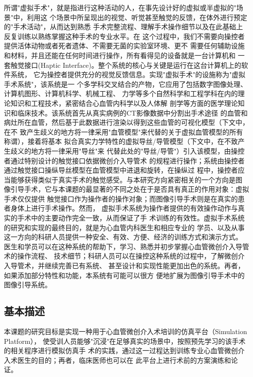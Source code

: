 所谓"虚拟手术"，就是指进行这种活动的人，在事先设计好的虚拟或半虚拟的"场景"中，利用这
个场景中所呈现出的视觉、听觉甚至触觉的反馈，在体外进行预定的"手术活动"，从而达到熟悉
手术完整流程、理解手术操作细节以及在此基础上反复训练以熟练掌握这种手术的专业水平。在
这个过程中，我们不需要向操控者提供活体动物或者死者遗体、不需要无菌的实验室环境、更不
需要任何辅助设施和材料，并且还能在任何时间进行操作，所有看得见的设备就是一台计算机和
一套触觉接口(Haptic Interface)。整个系统的核心与关键是运行在这台计算机上的软件系统，
它为操控者提供充分的视觉反馈信息。实现"虚拟手术"的设施称为"虚拟手术系统"，该系统是一
个多学科交叉结合的产物，它应用了包括数字图像处理、计算机图形、计算机科学、机械工程、
力学等多个自然科学和工程学科在内的理论知识和工程技术，紧密结合心血管内科学以及人体解
剖学等方面的医学理论知识和临床技术。该系统首先从真实病例的CT影像数据中分割出手术途径
的血管和病灶所在血管，然后基于此数据进行渲染以得到这些血管的可视化模型（下文中，在不
致产生歧义的地方将一律采用"血管模型"来代替的关于虚拟血管模型的所有称谓），接着将基本
拟合真实力学特性的虚拟导丝/导管模型（下文中，在不致产生歧义的地方将一律采用"导丝"来
代替此处的"导丝/导管"）引入该模型，由操控者通过特别设计的触觉接口依据微创介入导管术
的规程进行操作；系统由操控者通过触觉接口操纵导丝模型在血管模型中进退和旋转，在操纵过
程中，操控者应当能够获得类似于真实手术的触觉感受。与本研究方向紧密相关的一个方向是图
像引导手术，它与本课题的最显著的不同之处在于是否具有真正的作用对象：虚拟手术仅仅提供
触觉接口作为操作者的操作对象；而图像引导手术则是在真实的患者身体上进行手术操作。然而，
虚拟手术系统为操作者提供的有效操作动作与真实的手术中的主要动作完全一致，从而保证了手
术训练的有效性。虚拟手术系统的研究和实现的最终目的，就是为心血管内科医生和相应专业的
学员、以及从事这一方向的科研人员提供一种安全、有效、方便、经济的训练方式和演示方式。
医生和学员可以在这种系统的帮助下，学习、熟悉并初步掌握心血管微创介入导管术的操作流程、
技术细节；科研人员可以在操控这种系统的过程中，了解微创介入导管术，并继续完善已有系统、
甚至设计和实现性能更加出色的系统。再者，如果添加部分特性和功能，本系统有可能可以很方
便地扩展为图像引导手术中的图像引导系统。


\subsection{基本描述}
\label{subsec1-1-2}

本课题的研究目标是实现一种用于心血管微创介入术培训的仿真平台（Simulation Platform），
使受训人员能够"沉浸"在足够真实的场景中，按照预先学习的该手术的相关程序进行模拟仿真手
术的实践，通过这一过程达到训练专业心血管微创介入术医生的目的；再者，临床医师也可以在
此平台上进行术前的方案演练和论证。

